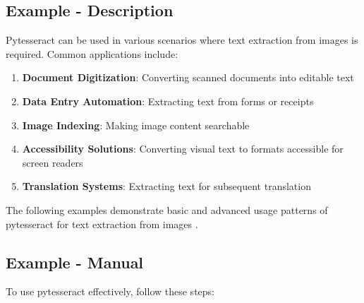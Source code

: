 \subsection{Example - Description}
Pytesseract can be used in various scenarios where text extraction from images is required. Common applications include:

\begin{enumerate}
	\item \textbf{Document Digitization}: Converting scanned documents into editable text
	\item \textbf{Data Entry Automation}: Extracting text from forms or receipts
	\item \textbf{Image Indexing}: Making image content searchable
	\item \textbf{Accessibility Solutions}: Converting visual text to formats accessible for screen readers
	\item \textbf{Translation Systems}: Extracting text for subsequent translation
\end{enumerate}

The following examples demonstrate basic and advanced usage patterns of pytesseract for text extraction from images \cite {Betterpath:2023, DataCamp:2024}.

\subsection{Example - Manual}
To use pytesseract effectively, follow these steps:

